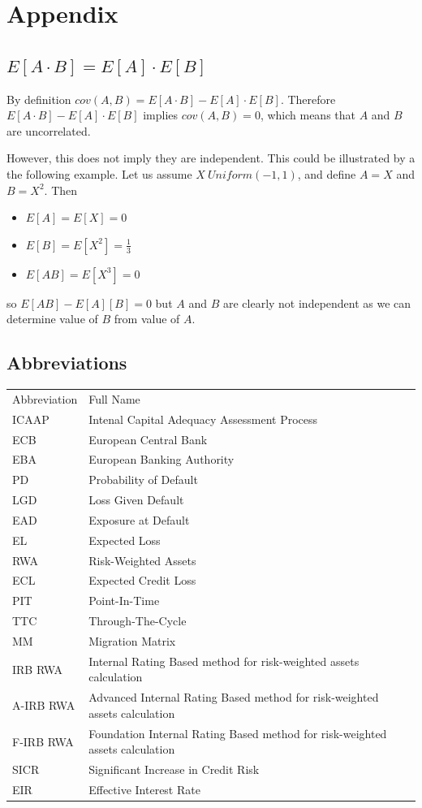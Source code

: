 \documentclass[11pt,a4paper]{article}
\begin{document}
\section{Appendix}

\subsection{$E[A \cdot B] = E[A] \cdot E[B]$}

By definition $cov(A, B) = E[A \cdot B] - E[A] \cdot E[B]$. Therefore $E[A \cdot B] - E[A] \cdot E[B]$ implies $cov(A, B) = 0$, which means that $A$ and $B$ are uncorrelated.

However, this does not imply they are independent. This could be illustrated by a the following example. Let us assume $X ~ Uniform(-1, 1)$, and define $A = X$ and $B = X^2$. Then
\begin{itemize}
\item $E[A] = E[X] = 0$
\item $E[B] = E[X^2] = \frac{1}{3}$
\item $E[AB] = E[X^3] = 0$
\end{itemize}
so $E[AB] - E[A][B] = 0$ but $A$ and $B$ are clearly not independent as we can determine value of $B$ from value of $A$.

\subsection{Abbreviations}

\begin{center}
\begin{tabular}{ll}
Abbreviation & Full Name\\[5pt]
ICAAP & Intenal Capital Adequacy Assessment Process\\
ECB & European Central Bank \\
EBA & European Banking Authority\\
PD & Probability of Default\\
LGD & Loss Given Default\\
EAD & Exposure at Default\\
EL & Expected Loss\\
RWA & Risk-Weighted Assets\\
ECL & Expected Credit Loss\\
PIT & Point-In-Time\\
TTC & Through-The-Cycle\\
MM & Migration Matrix\\
IRB RWA & Internal Rating Based method for risk-weighted assets calculation\\
A-IRB RWA & Advanced Internal Rating Based method for risk-weighted assets calculation\\
F-IRB RWA & Foundation Internal Rating Based method for risk-weighted assets calculation\\
SICR & Significant Increase in Credit Risk\\
EIR & Effective Interest Rate
\end{tabular}
\end{center}
\end{document}
